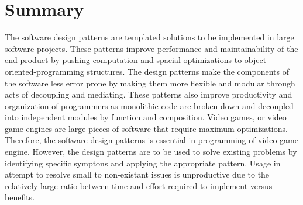 \section*{Summary}


The software design patterns are templated solutions to be implemented in large software projects. These patterns improve performance and maintainability of the end product by pushing computation and spacial optimizations to object-oriented-programming structures. The design patterns make the components of the software less error prone by making them more flexible and modular through acts of decoupling and mediating. These patterns also improve productivity and organization of programmers as monolithic code are broken down and decoupled into independent modules by function and composition. Video games, or video game engines are large pieces of software that require maximum optimizations. Therefore, the software design patterns is essential in programming of video game engine. However, the design patterns are to be used to solve existing problems by identifying specific symptons and applying the appropriate pattern. Usage in attempt to resolve small to non-existant issues is unproductive due to the relatively large ratio between time and effort required to implement versus benefits.


\newpage